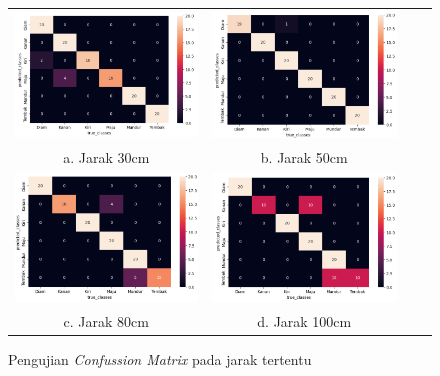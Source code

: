 \begin{enumerate}
  \begin{figure}[H]
      \begin{tabular}{cccc}
        \includegraphics[width=0.4\linewidth]{../Gambar/cm30.png} & \includegraphics[width=0.4\linewidth]{../Gambar/cm50.png} \\
        a. Jarak 30cm & b. Jarak 50cm \\ 
        \includegraphics[width=0.4\linewidth]{../Gambar/cm80.png} & \includegraphics[width=0.4\linewidth]{../Gambar/cm100.png} \\
        c. Jarak 80cm & d. Jarak 100cm
      \end{tabular}
      \centering
      \caption{Pengujian \emph{Confussion Matrix} pada jarak tertentu}
      \label{fig:confusionmatrixjarak}
  \end{figure}
  

\end{enumerate}